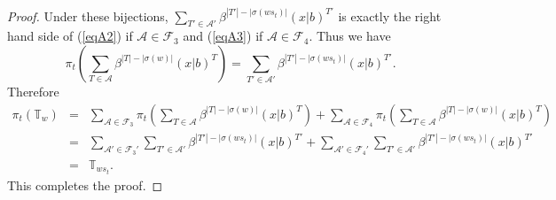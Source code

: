 \documentclass[11pt,reqno,sumlimits]{amsart}
\newcommand{\bbT}{{\mathbb T}}
\newcommand{\calF}{{\mathcal F}}
\newcommand{\scA}{{\mathscr A}}
\theoremstyle{definition}
\numberwithin{equation}{section}
\begin{document}
\begin{proof}
Under these bijections, $\sum_{T'\in \scA'}\beta^{|T'|-|\sigma(ws_t)|}(x|b)^{T'}$ is exactly the right hand side of (\ref{eqA2}) if $\scA\in \calF_3$ and (\ref{eqA3}) if $\scA\in \calF_4$. Thus we have 
\[
\pi_t\left(\sum_{T\in \scA}\beta^{|T|-|\sigma(w)|}(x|b)^T\right) =\sum_{T'\in \scA'}\beta^{|T'|-|\sigma(ws_t)|}(x|b)^{T'}.
\]
Therefore
\begin{eqnarray*}
\pi_t(\bbT_w) 
&=& \sum_{\scA\in \calF_3} \pi_t\left(\sum_{T\in \scA} \beta^{|T|-|\sigma(w)|}(x|b)^T\right)+\sum_{\scA\in \calF_4} \pi_t\left(\sum_{T\in \scA} \beta^{|T|-|\sigma(w)|}(x|b)^T\right)\\
&=& \sum_{\scA'\in \calF_3'} \sum_{T'\in \scA'}\beta^{|T'|-|\sigma(ws_t)|}(x|b)^{T'}+\sum_{\scA'\in \calF_4'} \sum_{T'\in \scA'}\beta^{|T'|-|\sigma(ws_t)|}(x|b)^{T'}\\
&=& \bbT_{ws_t}.
\end{eqnarray*}
This completes the proof.
\end{proof}
\end{document}
